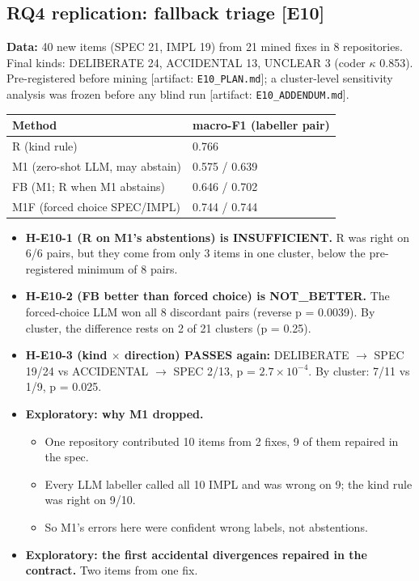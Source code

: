 \documentclass[acmsmall,screen,review,anonymous]{acmart}
\newcommand{\artifact}[1]{{\footnotesize [artifact: #1]}}
\begin{document}
\subsection{RQ4 replication: fallback triage [E10]}
\textbf{Data:} 40 new items (SPEC 21, IMPL 19) from 21 mined fixes in 8 repositories. Final kinds: DELIBERATE 24, ACCIDENTAL 13, UNCLEAR 3 (coder $\kappa$ 0.853). Pre-registered before mining \artifact{\texttt{E10\_PLAN.md}}; a cluster-level sensitivity analysis was frozen before any blind run \artifact{\texttt{E10\_ADDENDUM.md}}.

\begin{table}[t]
\small
\begin{tabularx}{\linewidth}{lX}
\toprule
Method & macro-F1 (labeller pair) \\
\midrule
R (kind rule) & 0.766 \\
M1 (zero-shot LLM, may abstain) & 0.575 / 0.639 \\
FB (M1; R when M1 abstains) & 0.646 / 0.702 \\
M1F (forced choice SPEC/IMPL) & 0.744 / 0.744 \\
\bottomrule
\end{tabularx}
\end{table}

\begin{itemize}
\item \textbf{H-E10-1 (R on M1's abstentions) is INSUFFICIENT.} R was right on 6/6 pairs, but they come from only 3 items in one cluster, below the pre-registered minimum of 8 pairs.
\item \textbf{H-E10-2 (FB better than forced choice) is NOT\_BETTER.} The forced-choice LLM won all 8 discordant pairs (reverse p = 0.0039). By cluster, the difference rests on 2 of 21 clusters (p = 0.25).
\item \textbf{H-E10-3 (kind $\times$ direction) PASSES again:} DELIBERATE $\rightarrow$ SPEC 19/24 vs ACCIDENTAL $\rightarrow$ SPEC 2/13, p = $2.7 \times 10^{-4}$. By cluster: 7/11 vs 1/9, p = 0.025.
\item \textbf{Exploratory: why M1 dropped.}
\begin{itemize}
\item One repository contributed 10 items from 2 fixes, 9 of them repaired in the spec.
\item Every LLM labeller called all 10 IMPL and was wrong on 9; the kind rule was right on 9/10.
\item So M1's errors here were confident wrong labels, not abstentions.
\end{itemize}
\item \textbf{Exploratory: the first accidental divergences repaired in the contract.} Two items from one fix.
\end{itemize}
\end{document}
